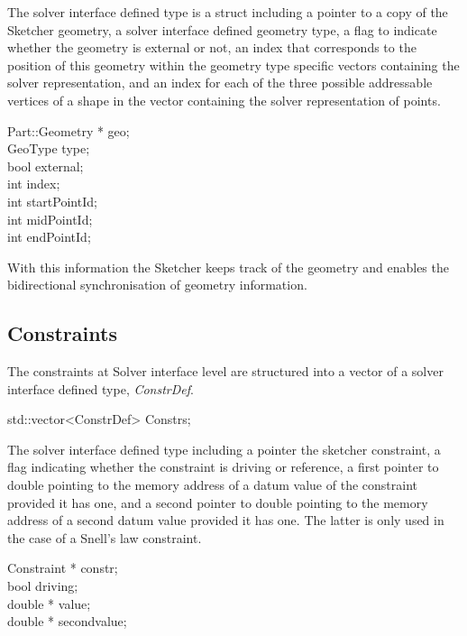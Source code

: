 \documentclass[12pt,twoside,a4paper]{book}
\begin{document}
    The solver interface defined type is a struct including a pointer to a copy of the Sketcher geometry, a solver interface defined geometry type, a flag to indicate whether the geometry is external or not, an index that corresponds to the position of this geometry within the geometry type specific vectors containing the solver representation, and an index for each of the three possible addressable vertices of a shape in the vector containing the solver representation of points.

    \begin{codequote}
    Part::Geometry  * geo;\\
    GeoType           type;\\
    bool              external;\\
    int               index;\\
    int               startPointId;\\
    int               midPointId;\\
    int               endPointId;
    \end{codequote}

    With this information the Sketcher keeps track of the geometry and enables the bidirectional synchronisation of geometry information.

    \subsection{Constraints}

    The constraints at Solver interface level are structured into a vector of a solver interface defined type, \emph{ConstrDef}.

    \begin{codequote}
    std::vector\textless{}ConstrDef\textgreater{} Constrs;
    \end{codequote}

    The solver interface defined type including a pointer the sketcher constraint, a flag indicating whether the constraint is driving or reference, a first pointer to double pointing to the memory address of a datum value of the constraint provided it has one, and a second pointer to double pointing to the memory address of a second datum value provided it has one. The latter is only used in the case of a Snell's law constraint.

    \begin{codequote}
    Constraint *    constr;\\
    bool            driving;\\
    double *        value;\\
    double *        secondvalue;
    \end{codequote}
\end{document}
